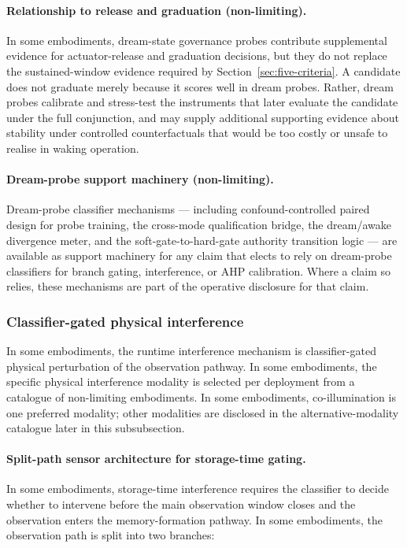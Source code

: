 \documentclass[a4paper,12pt]{article}
\begin{document}
\paragraph{Relationship to release and graduation (non-limiting).}
In some embodiments, dream-state governance probes contribute
supplemental evidence for actuator-release and graduation decisions,
but they do not replace the sustained-window evidence required by
Section~\ref{sec:five-criteria}. A candidate does not graduate merely
because it scores well in dream probes. Rather, dream probes calibrate
and stress-test the instruments that later evaluate the candidate under
the full conjunction, and may supply additional supporting evidence
about stability under controlled counterfactuals that would be too
costly or unsafe to realise in waking operation.
\paragraph{Dream-probe support machinery (non-limiting).}
Dream-probe classifier mechanisms --- including confound-controlled
paired design for probe training, the cross-mode qualification
bridge, the dream/awake divergence meter, and the
soft-gate-to-hard-gate authority transition logic --- are available
as support machinery for any claim that elects to rely on
dream-probe classifiers for branch gating, interference, or AHP
calibration. Where a claim so relies, these mechanisms are part of
the operative disclosure for that claim.

\subsubsection{Classifier-gated physical interference}
\label{sec:co-illumination}

In some embodiments, the runtime interference mechanism is
classifier-gated physical perturbation of the observation pathway.
In some embodiments, the specific physical interference modality is
selected per deployment from a catalogue of non-limiting embodiments.
In some embodiments, co-illumination is one preferred modality; other
modalities are disclosed in the alternative-modality catalogue
later in this subsubsection.

\paragraph{Split-path sensor architecture for storage-time gating.}
In some embodiments, storage-time interference requires the
classifier to decide whether to intervene before the main
observation window closes and the observation enters the
memory-formation pathway. In some embodiments, the observation path
is split into two branches:
\end{document}
